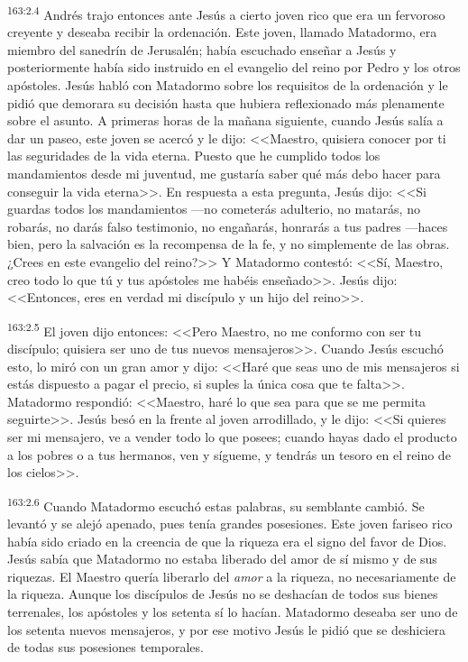 \par 
\textsuperscript{163:2.4} Andrés trajo entonces ante Jesús a cierto joven rico que era un fervoroso creyente y deseaba recibir la ordenación. Este joven, llamado Matadormo, era miembro del sanedrín de Jerusalén; había escuchado enseñar a Jesús y posteriormente había sido instruido en el evangelio del reino por Pedro y los otros apóstoles. Jesús habló con Matadormo sobre los requisitos de la ordenación y le pidió que demorara su decisión hasta que hubiera reflexionado más plenamente sobre el asunto. A primeras horas de la mañana siguiente, cuando Jesús salía a dar un paseo, este joven se acercó y le dijo: <<Maestro, quisiera conocer por ti las seguridades de la vida eterna. Puesto que he cumplido todos los mandamientos desde mi juventud, me gustaría saber qué más debo hacer para conseguir la vida eterna>>. En respuesta a esta pregunta, Jesús dijo: <<Si guardas todos los mandamientos ---no cometerás adulterio, no matarás, no robarás, no darás falso testimonio, no engañarás, honrarás a tus padres ---haces bien, pero la salvación es la recompensa de la fe, y no simplemente de las obras. ¿Crees en este evangelio del reino?>> Y Matadormo contestó: <<Sí, Maestro, creo todo lo que tú y tus apóstoles me habéis enseñado>>. Jesús dijo: <<Entonces, eres en verdad mi discípulo y un hijo del reino>>.

\par 
\textsuperscript{163:2.5} El joven dijo entonces: <<Pero Maestro, no me conformo con ser tu discípulo; quisiera ser uno de tus nuevos mensajeros>>. Cuando Jesús escuchó esto, lo miró con un gran amor y dijo: <<Haré que seas uno de mis mensajeros si estás dispuesto a pagar el precio, si suples la única cosa que te falta>>. Matadormo respondió: <<Maestro, haré lo que sea para que se me permita seguirte>>. Jesús besó en la frente al joven arrodillado, y le dijo: <<Si quieres ser mi mensajero, ve a vender todo lo que posees; cuando hayas dado el producto a los pobres o a tus hermanos, ven y sígueme, y tendrás un tesoro en el reino de los cielos>>.

\par 
\textsuperscript{163:2.6} Cuando Matadormo escuchó estas palabras, su semblante cambió. Se levantó y se alejó apenado, pues tenía grandes posesiones. Este joven fariseo rico había sido criado en la creencia de que la riqueza era el signo del favor de Dios. Jesús sabía que Matadormo no estaba liberado del amor de sí mismo y de sus riquezas. El Maestro quería liberarlo del \textit{amor} a la riqueza, no necesariamente de la riqueza. Aunque los discípulos de Jesús no se deshacían de todos sus bienes terrenales, los apóstoles y los setenta sí lo hacían. Matadormo deseaba ser uno de los setenta nuevos mensajeros, y por ese motivo Jesús le pidió que se deshiciera de todas sus posesiones temporales.

